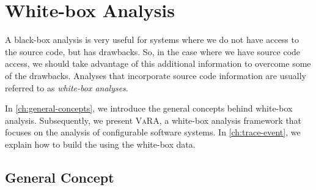 



\section{White-box Analysis}\label{ch:Whitebox}
A black-box analysis is very useful for systems where we do not have access to the source code, but has drawbacks.
So, in the case where we have source code access, we should take advantage of this additional information to overcome some of the drawbacks.
Analyses that incorporate source code information are usually referred to as \emph{white-box analyses}. 

In \autoref{ch:general-concepts}, we introduce the general concepts behind white-box analysis.
Subsequently, we present \textsc{VaRA}, a white-box analysis framework that focuses on the analysis of configurable software systems. 
In \autoref{ch:trace-event}, we explain how to build the {\perfInfluenceModel} using the white-box data.

\subsection{General Concept}\label{wb:general-concept}


